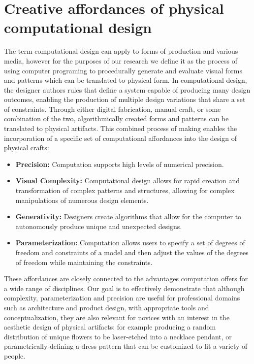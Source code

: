 \documentclass{sigchi}
\begin{document}
\section{Creative affordances of physical computational design}
The term computational design can apply to forms of production and various media, however for the purposes of our research we define it as the process of using computer programing to procedurally generate and evaluate visual forms and patterns which can be translated to physical form. In computational design, the designer authors rules that define a system capable of producing many design outcomes, enabling the production of multiple design variations that share a set of constraints. Through either digital fabrication, manual craft, or some combination of the two, algorithmically created forms and patterns can be translated to physical artifacts. This combined process of making enables the incorporation of a specific set of computational affordances into the design of physical crafts:
\begin{itemize}
\item \textbf{Precision:} Computation supports high levels of numerical precision.
\vspace{-8pt}
\item \textbf{Visual Complexity:} Computational design allows for rapid creation and transformation of complex patterns and structures, allowing for complex manipulations of numerous design elements.
\vspace{-6pt}
\item \textbf{Generativity:} Designers create algorithms that allow for the computer to autonomously produce unique and unexpected designs.
\vspace{-6pt}
\item \textbf{Parameterization:} Computation allows users to specify a set of degrees of freedom and constraints of a model and then adjust the values of the degrees of freedom while maintaining the constraints.
\vspace{-6pt}
\end{itemize} 
These affordances are closely connected to the advantages computation offers for a wide range of disciplines. Our goal is to effectively demonstrate that although complexity, parameterization and precision are useful for professional domains such as architecture and product design, with appropriate tools and conceptualization, they are also relevant for novices with an interest in the aesthetic design of physical artifacts: for example producing a random distribution of unique flowers to be laser-etched into a necklace pendant, or parametrically defining a dress pattern that can be customized to fit a variety of people. 
\end{document}
